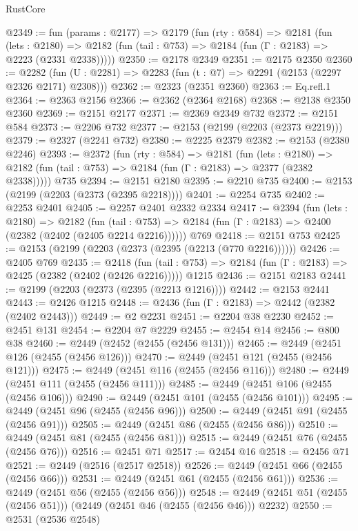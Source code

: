 \begin{lexlean}{RustCore}
\begin{coremodule}
@2349 := fun (params : @2177) =>
  @2179
    (fun (rty : @584) =>
    @2181
      (fun (lets : @2180) =>
      @2182 (fun (tail : @753) => @2184 (fun (Γ : @2183) => @2223 (@2331 @2338)))))
@2350 := @2178 @2349
@2351 := @2175 @2350
@2360 := @2282 (fun (U : @2281) => @2283 (fun (t : @7) => @2291 (@2153 (@2297 @2326 @2171) @2308)))
@2362 := @2323 (@2351 @2360)
@2363 := Eq.refl.{1}
@2364 := @2363 @2156
@2366 := @2362 (@2364 @2168)
@2368 := @2138 @2350 @2360
@2369 := @2151 @2177
@2371 := @2369 @2349 @732
@2372 := @2151 @584
@2373 := @2206 @732
@2377 := @2153 (@2199 (@2203 (@2373 @2219)))
@2379 := @2327 (@2241 @732)
@2380 := @2225 @2379
@2382 := @2153 (@2380 @2246)
@2393 := @2372
    (fun (rty : @584) =>
    @2181
      (fun (lets : @2180) =>
      @2182 (fun (tail : @753) => @2184 (fun (Γ : @2183) => @2377 (@2382 @2338)))))
    @735
@2394 := @2151 @2180
@2395 := @2210 @735
@2400 := @2153 (@2199 (@2203 (@2373 (@2395 @2218))))
@2401 := @2254 @735
@2402 := @2253 @2401
@2405 := @2257 @2401 @2332 @2334
@2417 := @2394
    (fun (lets : @2180) =>
    @2182
      (fun (tail : @753) => @2184 (fun (Γ : @2183) => @2400 (@2382 (@2402 (@2405 @2214 @2216))))))
    @769
@2418 := @2151 @753
@2425 := @2153 (@2199 (@2203 (@2373 (@2395 (@2213 (@770 @2216))))))
@2426 := @2405 @769
@2435 := @2418
    (fun (tail : @753) => @2184 (fun (Γ : @2183) => @2425 (@2382 (@2402 (@2426 @2216)))))
    @1215
@2436 := @2151 @2183
@2441 := @2199 (@2203 (@2373 (@2395 (@2213 @1216))))
@2442 := @2153 @2441
@2443 := @2426 @1215
@2448 := @2436 (fun (Γ : @2183) => @2442 (@2382 (@2402 @2443)))
@2449 := @2 @2231
@2451 := @2204 @38 @2230
@2452 := @2451 @131
@2454 := @2204 @7 @2229
@2455 := @2454 @14
@2456 := @800 @38
@2460 := @2449 (@2452 (@2455 (@2456 @131)))
@2465 := @2449 (@2451 @126 (@2455 (@2456 @126)))
@2470 := @2449 (@2451 @121 (@2455 (@2456 @121)))
@2475 := @2449 (@2451 @116 (@2455 (@2456 @116)))
@2480 := @2449 (@2451 @111 (@2455 (@2456 @111)))
@2485 := @2449 (@2451 @106 (@2455 (@2456 @106)))
@2490 := @2449 (@2451 @101 (@2455 (@2456 @101)))
@2495 := @2449 (@2451 @96 (@2455 (@2456 @96)))
@2500 := @2449 (@2451 @91 (@2455 (@2456 @91)))
@2505 := @2449 (@2451 @86 (@2455 (@2456 @86)))
@2510 := @2449 (@2451 @81 (@2455 (@2456 @81)))
@2515 := @2449 (@2451 @76 (@2455 (@2456 @76)))
@2516 := @2451 @71
@2517 := @2454 @16
@2518 := @2456 @71
@2521 := @2449 (@2516 (@2517 @2518))
@2526 := @2449 (@2451 @66 (@2455 (@2456 @66)))
@2531 := @2449 (@2451 @61 (@2455 (@2456 @61)))
@2536 := @2449 (@2451 @56 (@2455 (@2456 @56)))
@2548 := @2449 (@2451 @51 (@2455 (@2456 @51))) (@2449 (@2451 @46 (@2455 (@2456 @46))) @2232)
@2550 := @2531 (@2536 @2548)

\end{coremodule}
\end{lexlean}

